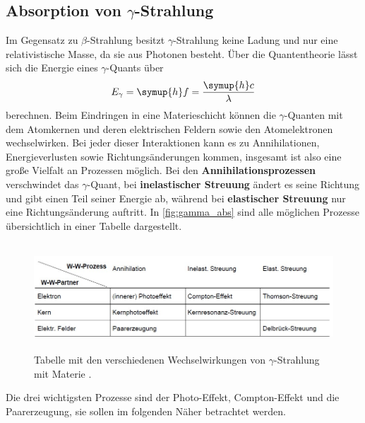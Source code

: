 \subsection{\texorpdfstring{Absorption von $\gamma$-Strahlung}{Absorption von Gamma-Strahlung}}

Im Gegensatz zu $\beta$-Strahlung besitzt $\gamma$-Strahlung keine Ladung und nur eine relativistische Masse,
da sie aus Photonen besteht. Über die Quantentheorie lässt sich die Energie eines $\gamma$-Quants über
\begin{equation*}
    E_\gamma = \symup{h}f = \frac{\symup{h}c}{\lambda}
\end{equation*}
berechnen.
Beim Eindringen in eine Materieschicht können die $\gamma$-Quanten mit dem Atomkernen und deren elektrischen Feldern
sowie den Atomelektronen wechselwirken.
Bei jeder dieser Interaktionen kann es zu Annihilationen, Energieverlusten sowie Richtungsänderungen kommen,
insgesamt ist also eine große Vielfalt an Prozessen möglich.
Bei den \textbf{Annihilationsprozessen} verschwindet das $\gamma$-Quant, bei \textbf{inelastischer Streuung}
ändert es seine Richtung und gibt einen Teil seiner Energie ab, während bei \textbf{elastischer Streuung} nur
eine Richtungsänderung auftritt.
In \autoref{fig:gamma_abs} sind alle möglichen Prozesse übersichtlich in einer Tabelle dargestellt.
\begin{figure}[H]
    \centering
    \includegraphics[height=4cm]{content/pics/gamma_absorption.jpg}
    \caption{Tabelle mit den verschiedenen Wechselwirkungen von $\gamma$-Strahlung mit Materie \cite{v704}.}
    \label{fig:gamma_abs}
\end{figure}
Die drei wichtigsten Prozesse sind der Photo-Effekt, Compton-Effekt und die Paarerzeugung, sie sollen im
folgenden Näher betrachtet werden.

